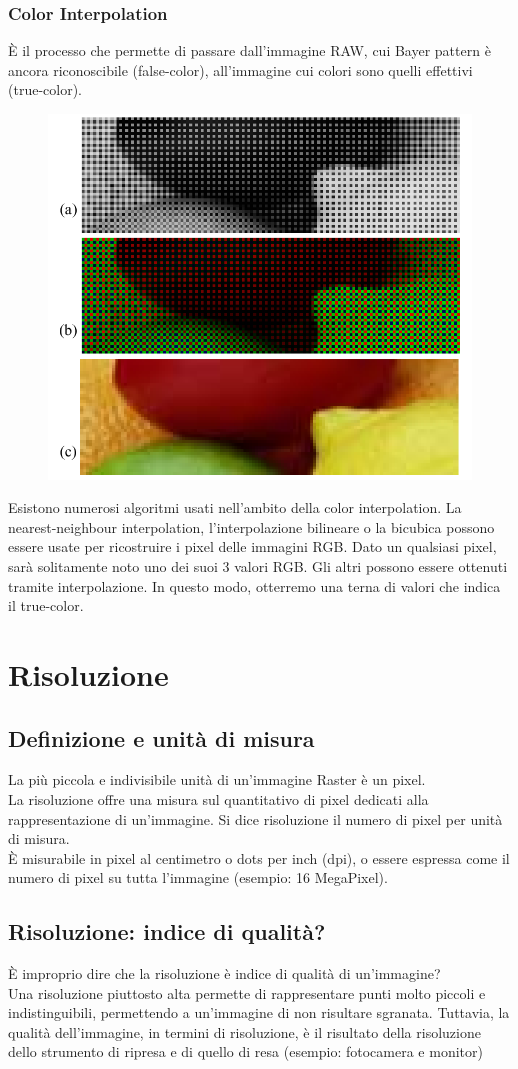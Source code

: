 \documentclass{report}
\begin{document}
	\subsection{Color Interpolation}
	È il processo che permette di passare dall'immagine RAW, cui Bayer pattern è ancora riconoscibile (false-color), all'immagine cui colori sono quelli effettivi (true-color).
		
	\begin{figure}[htp]
		\centering
		\includegraphics[width=0.5\linewidth]{colorinterp.png}
	\end{figure}
	Esistono numerosi algoritmi usati nell'ambito della color interpolation.
	La nearest-neighbour interpolation, l'interpolazione bilineare o la bicubica possono essere usate per ricostruire i pixel delle immagini RGB.
	Dato un qualsiasi pixel, sarà solitamente noto uno dei suoi 3 valori RGB. Gli altri possono essere ottenuti tramite interpolazione. In questo modo, otterremo una terna di valori che indica il true-color.
	\newpage
	\chapter{Risoluzione}
	\section{Definizione e unità di misura}
	La più piccola e indivisibile unità di un'immagine Raster è un pixel.\\
	La risoluzione offre una misura sul quantitativo di pixel dedicati alla rappresentazione di un'immagine.
	Si dice risoluzione il numero di pixel per unità di misura.\\
	È misurabile in pixel al centimetro o dots per inch (dpi), o essere espressa come il numero di pixel su tutta l'immagine (esempio: 16 MegaPixel).
	\section{Risoluzione: indice di qualità?}
	È improprio dire che la risoluzione è indice di qualità di un'immagine?\\
	Una risoluzione piuttosto alta permette di rappresentare punti molto piccoli e indistinguibili, permettendo a un'immagine di non risultare sgranata.
	Tuttavia, la qualità dell'immagine, in termini di risoluzione, è il risultato della risoluzione dello strumento di ripresa e di quello di resa (esempio: fotocamera e monitor)
\end{document}
